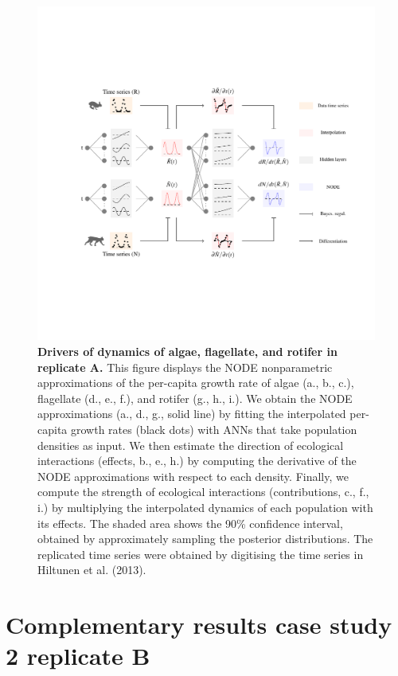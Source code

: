 \documentclass[11pt, oneside]{article}
\begin{document}
\newpage
\begin{figure}[H]
\includegraphics[width=1\linewidth,page=16]{figures/main.pdf}
\caption{
    \textbf{Drivers of dynamics of algae, flagellate, and rotifer in replicate A.}
    This figure displays the NODE nonparametric approximations of the per-capita growth rate of algae (a., b., c.), flagellate (d., e., f.), and rotifer (g., h., i.).
    We obtain the NODE approximations (a., d., g., solid line) by fitting the interpolated per-capita growth rates (black dots) with ANNs that take population densities as input.
    We then estimate the direction of ecological interactions (effects, b., e., h.) by computing the derivative of the NODE approximations with respect to each density.
    Finally, we compute the strength of ecological interactions (contributions, c., f., i.) by multiplying the interpolated dynamics of each population with its effects.
    The shaded area shows the 90\% confidence interval, obtained by approximately sampling the posterior distributions. 
    The replicated time series were obtained by digitising the time series in Hiltunen et al. (2013).
}
\end{figure}
\newpage

\newpage
\section{Complementary results case study 2 replicate B}
\end{document}
